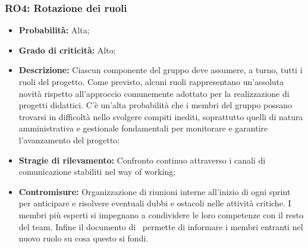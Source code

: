\subsubsection{RO4: Rotazione dei ruoli}
\begin{itemize}
    \item \textbf{Probabilità:} Alta;
    \item \textbf{Grado di criticità:} Alto;
    \item \textbf{Descrizione:} Ciascun componente del gruppo deve assumere, a turno, tutti i
    ruoli del progetto. Come previsto, alcuni ruoli rappresentano un’assoluta novità rispetto all’approccio comunemente adottato per la realizzazione di progetti
    didattici. C’è un’alta probabilità che i membri del gruppo possano trovarsi in
    difficoltà nello svolgere compiti inediti, soprattutto quelli di natura amministrativa e gestionale fondamentali per monitorare e garantire l’avanzamento del
    progetto;
    \item \textbf{Stragie di rilevamento:} Confronto continuo attraverso i canali di comunicazione stabiliti nel way of working;
    \item \textbf{Contromisure:} Organizzazione di riunioni interne all’inizio di ogni sprint per
    anticipare e risolvere eventuali dubbi e ostacoli nelle attività critiche. I membri
    più esperti si impegnano a condividere le loro competenze con il resto del team. Infine il documento di \NdP\ permette di informare i membri entranti nel nuovo ruolo su cosa questo si fondi.
\end{itemize}
